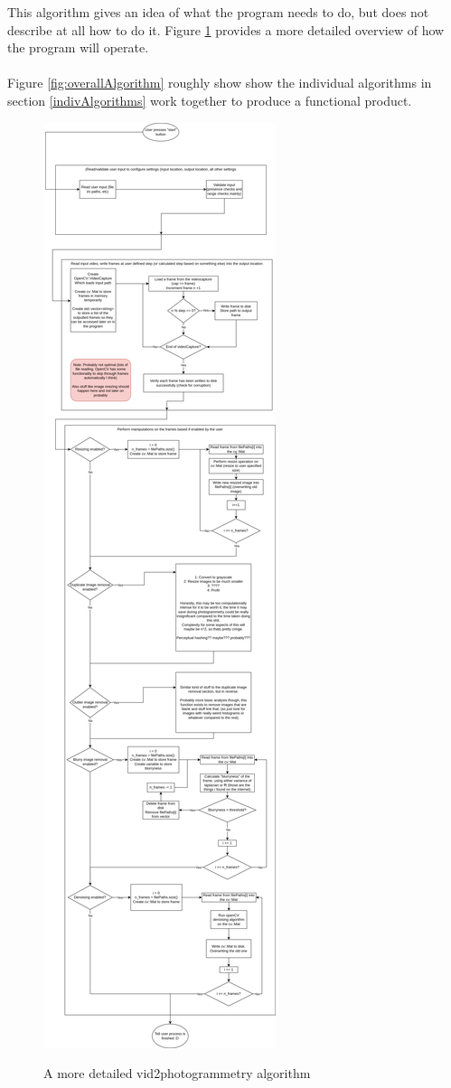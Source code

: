 \documentclass[11pt]{report}
\begin{document}
\newpage
This algorithm gives an idea of what the program needs to do, but does not describe at all how to do it. Figure \ref{fig:detailedOverallAlgorithm} provides a more detailed overview of how the program will operate.\\\\
Figure \ref{fig:overallAlgorithm} roughly show show the individual algorithms in section \ref{indivAlgorithms} work together to produce a functional product.
\begin{figure}
	\centering
	\caption{A more detailed vid2photogrammetry algorithm}
	\includegraphics[height=0.6\paperheight]{designDiagrams/detailedOverallAlgorithm}
	\label{fig:detailedOverallAlgorithm}
\end{figure}\\\\
\newpage
\end{document}
